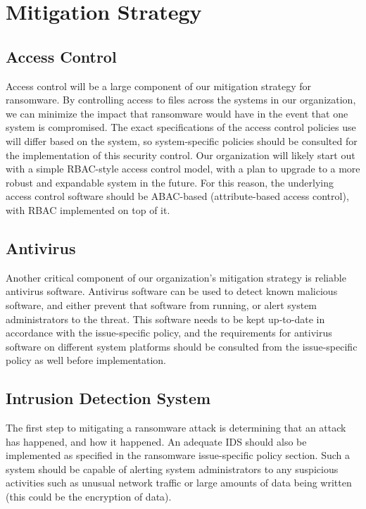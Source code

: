 \documentclass[11pt]{article}
\begin{document}
\section{Mitigation Strategy}
\label{sec:org87c667a}
\subsection{Access Control}
\label{sec:org53eaa83}
Access control will be a large component of our mitigation strategy for ransomware. By controlling access to files across the systems in our organization, we can minimize the impact that ransomware would have in the event that one system is compromised. The exact specifications of the access control policies use will differ based on the system, so system-specific policies should be consulted for the implementation of this security control. Our organization will likely start out with a simple RBAC-style access control model, with a plan to upgrade to a more robust and expandable system in the future. For this reason, the underlying access control software should be ABAC-based (attribute-based access control), with RBAC implemented on top of it.

\subsection{Antivirus}
\label{sec:org8ea6f62}
Another critical component of our organization's mitigation strategy is reliable antivirus software. Antivirus software can be used to detect known malicious software, and either prevent that software from running, or alert system administrators to the threat. This software needs to be kept up-to-date in accordance with the issue-specific policy, and the requirements for antivirus software on different system platforms should be consulted from the issue-specific policy as well before implementation.

\subsection{Intrusion Detection System}
\label{sec:orga33bf58}
The first step to mitigating a ransomware attack is determining that an attack has happened, and how it happened. An adequate IDS should also be implemented as specified in the ransomware issue-specific policy section. Such a system should be capable of alerting system administrators to any suspicious activities such as unusual network traffic or large amounts of data being written (this could be the encryption of data).
\end{document}
